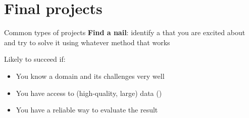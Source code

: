 \documentclass[usenames,dvipsnames,notes,11pt,aspectratio=169,hyperref={colorlinks=true, linkcolor=blue}]{beamer}
\begin{document}
%
%

\section{Final projects}

\begin{frame}
    {Common types of projects}
    \textbf{Find a nail}: identify a  that you are excited about and try to solve it using whatever method that works


    Likely to succeed if:\\
    \begin{itemize}
        \item You know a domain and its challenges very well
        \item You have access to (high-quality, large) data ()
        \item You have a reliable way to evaluate the result
    \end{itemize}
\end{frame}
\end{document}

